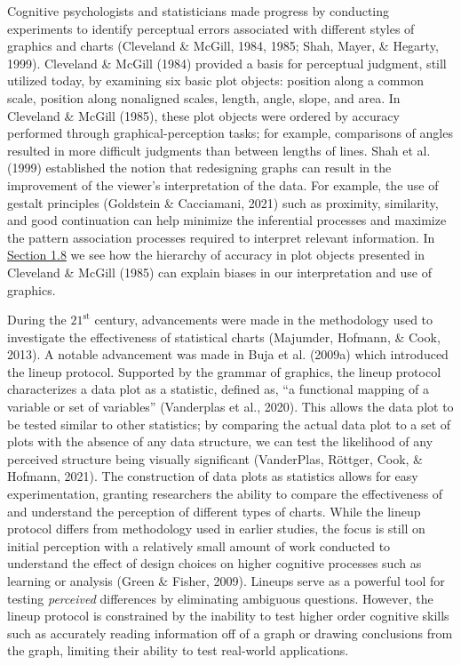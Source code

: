 \documentclass[print]{nuthesis}
\begin{document}
Cognitive psychologists and statisticians made progress by conducting experiments to identify perceptual errors associated with different styles of graphics and charts (Cleveland \& McGill, 1984, 1985; Shah, Mayer, \& Hegarty, 1999).
Cleveland \& McGill (1984) provided a basis for perceptual judgment, still utilized today, by examining six basic plot objects: position along a common scale, position along nonaligned scales, length, angle, slope, and area.
In Cleveland \& McGill (1985), these plot objects were ordered by accuracy performed through graphical-perception tasks; for example, comparisons of angles resulted in more difficult judgments than between lengths of lines.
Shah et al. (1999) established the notion that redesigning graphs can result in the improvement of the viewer's interpretation of the data.
For example, the use of gestalt principles (Goldstein \& Cacciamani, 2021) such as proximity, similarity, and good continuation can help minimize the inferential processes and maximize the pattern association processes required to interpret relevant information.
In \protect\hyperlink{underestimation}{Section 1.8} we see how the hierarchy of accuracy in plot objects presented in Cleveland \& McGill (1985) can explain biases in our interpretation and use of graphics.

During the \(\text{21}^{\text{st}}\) century, advancements were made in the methodology used to investigate the effectiveness of statistical charts (Majumder, Hofmann, \& Cook, 2013).
A notable advancement was made in Buja et al. (2009a) which introduced the lineup protocol.
Supported by the grammar of graphics, the lineup protocol characterizes a data plot as a statistic, defined as, ``a functional mapping of a variable or set of variables'' (Vanderplas et al., 2020).
This allows the data plot to be tested similar to other statistics; by comparing the actual data plot to a set of plots with the absence of any data structure, we can test the likelihood of any perceived structure being visually significant (VanderPlas, Röttger, Cook, \& Hofmann, 2021).
The construction of data plots as statistics allows for easy experimentation, granting researchers the ability to compare the effectiveness of and understand the perception of different types of charts.
While the lineup protocol differs from methodology used in earlier studies, the focus is still on initial perception with a relatively small amount of work conducted to understand the effect of design choices on higher cognitive processes such as learning or analysis (Green \& Fisher, 2009).
Lineups serve as a powerful tool for testing \emph{perceived} differences by eliminating ambiguous questions.
However, the lineup protocol is constrained by the inability to test higher order cognitive skills such as accurately reading information off of a graph or drawing conclusions from the graph, limiting their ability to test real-world applications.
\end{document}
